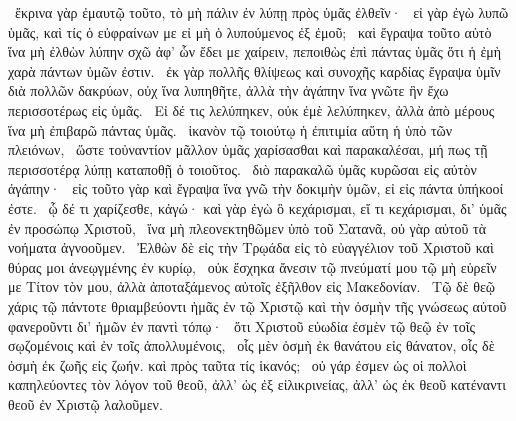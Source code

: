 ~ἔκρινα γὰρ ἐμαυτῷ τοῦτο, τὸ μὴ πάλιν ἐν λύπῃ πρὸς ὑμᾶς ἐλθεῖν·
~εἰ γὰρ ἐγὼ λυπῶ ὑμᾶς, καὶ τίς ὁ εὐφραίνων με εἰ μὴ ὁ λυπούμενος ἐξ ἐμοῦ;
~καὶ ἔγραψα τοῦτο αὐτὸ ἵνα μὴ ἐλθὼν λύπην σχῶ ἀφ’ ὧν ἔδει με χαίρειν, πεποιθὼς ἐπὶ πάντας ὑμᾶς ὅτι ἡ ἐμὴ χαρὰ πάντων ὑμῶν ἐστιν.
~ἐκ γὰρ πολλῆς θλίψεως καὶ συνοχῆς καρδίας ἔγραψα ὑμῖν διὰ πολλῶν δακρύων, οὐχ ἵνα λυπηθῆτε, ἀλλὰ τὴν ἀγάπην ἵνα γνῶτε ἣν ἔχω περισσοτέρως εἰς ὑμᾶς.
~Εἰ δέ τις λελύπηκεν, οὐκ ἐμὲ λελύπηκεν, ἀλλὰ ἀπὸ μέρους ἵνα μὴ ἐπιβαρῶ πάντας ὑμᾶς.
~ἱκανὸν τῷ τοιούτῳ ἡ ἐπιτιμία αὕτη ἡ ὑπὸ τῶν πλειόνων,
~ὥστε τοὐναντίον μᾶλλον ὑμᾶς χαρίσασθαι καὶ παρακαλέσαι, μή πως τῇ περισσοτέρᾳ λύπῃ καταποθῇ ὁ τοιοῦτος.
~διὸ παρακαλῶ ὑμᾶς κυρῶσαι εἰς αὐτὸν ἀγάπην·
~εἰς τοῦτο γὰρ καὶ ἔγραψα ἵνα γνῶ τὴν δοκιμὴν ὑμῶν, εἰ εἰς πάντα ὑπήκοοί ἐστε.
~ᾧ δέ τι χαρίζεσθε, κἀγώ· καὶ γὰρ ἐγὼ ὃ κεχάρισμαι, εἴ τι κεχάρισμαι, δι’ ὑμᾶς ἐν προσώπῳ Χριστοῦ,
~ἵνα μὴ πλεονεκτηθῶμεν ὑπὸ τοῦ Σατανᾶ, οὐ γὰρ αὐτοῦ τὰ νοήματα ἀγνοοῦμεν.
~Ἐλθὼν δὲ εἰς τὴν Τρῳάδα εἰς τὸ εὐαγγέλιον τοῦ Χριστοῦ καὶ θύρας μοι ἀνεῳγμένης ἐν κυρίῳ,
~οὐκ ἔσχηκα ἄνεσιν τῷ πνεύματί μου τῷ μὴ εὑρεῖν με Τίτον τὸν  μου, ἀλλὰ ἀποταξάμενος αὐτοῖς ἐξῆλθον εἰς Μακεδονίαν.
~Τῷ δὲ θεῷ χάρις τῷ πάντοτε θριαμβεύοντι ἡμᾶς ἐν τῷ Χριστῷ καὶ τὴν ὀσμὴν τῆς γνώσεως αὐτοῦ φανεροῦντι δι’ ἡμῶν ἐν παντὶ τόπῳ·
~ὅτι Χριστοῦ εὐωδία ἐσμὲν τῷ θεῷ ἐν τοῖς σῳζομένοις καὶ ἐν τοῖς ἀπολλυμένοις,
~οἷς μὲν ὀσμὴ ἐκ θανάτου εἰς θάνατον, οἷς δὲ ὀσμὴ ἐκ ζωῆς εἰς ζωήν. καὶ πρὸς ταῦτα τίς ἱκανός;
~οὐ γάρ ἐσμεν ὡς οἱ πολλοὶ καπηλεύοντες τὸν λόγον τοῦ θεοῦ, ἀλλ’ ὡς ἐξ εἰλικρινείας, ἀλλ’ ὡς ἐκ θεοῦ κατέναντι θεοῦ ἐν Χριστῷ λαλοῦμεν.

